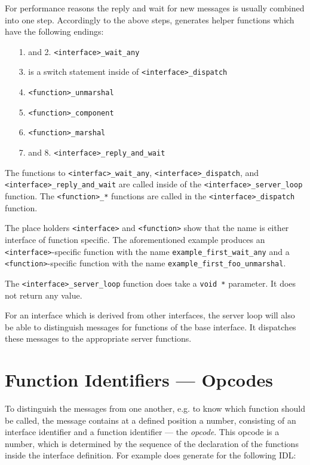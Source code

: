 For performance reasons the reply and wait for new messages
is usually combined into one step. Accordingly to the above steps,
\dice{} generates helper functions which have the following
endings:

\begin{enumerate}
\item[1.] and 2. \verb|<interface>_wait_any|
\item[3.] is a switch statement inside of \verb|<interface>_dispatch|
\item[4.] \verb|<function>_unmarshal|
\item[5.] \verb|<function>_component|
\item[6.] \verb|<function>_marshal|
\item[7.] and 8. \verb|<interface>_reply_and_wait|
\end{enumerate}

The functions to \verb|<interfac>_wait_any|, \verb|<interface>_dispatch|,
and \verb|<interface>_reply_and_wait| are called inside of the 
\verb|<interface>_server_loop| function. The \verb|<function>_*| 
functions are called in the \verb|<interface>_dispatch| function.

The place holders \verb|<interface>| and \verb|<function>| show that
the name is either interface of function specific. 
The aforementioned example produces
an \verb|<interface>|-specific function with the name
\verb|example_first_wait_any| and a \verb|<function>|-specific function
with the name \verb|example_first_foo_unmarshal|.


The \verb|<interface>_server_loop| function does take a \verb|void *|
parameter. It does not return any value.

For an interface which is derived from other interfaces, the
server loop will also be able to distinguish messages for functions
of the base interface. It dispatches these messages to the appropriate
server functions.

\section{Function Identifiers --- Opcodes}
\label{sec:opcode}
To distinguish the messages from one another, e.g. to know which 
function should be called, the message contains at a defined position
a number, consisting of an interface identifier and a function identifier 
 --- the {\em opcode}. This opcode is a number, which is determined by 
the sequence of the declaration of the functions inside the interface 
definition. For example does \dice{} generate for the following IDL:

